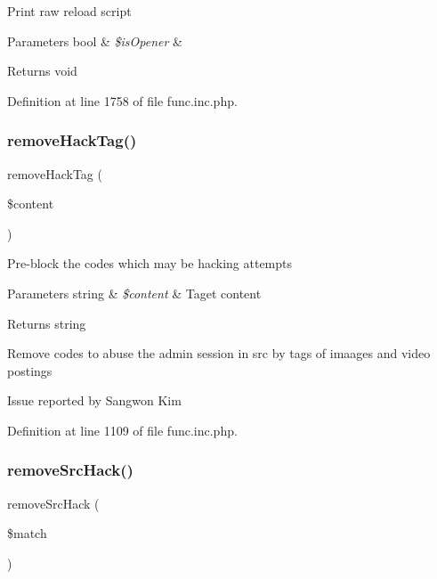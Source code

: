 Print raw reload script


\begin{DoxyParams}[1]{Parameters}
bool & {\em \$is\+Opener} & \\
\hline
\end{DoxyParams}
\begin{DoxyReturn}{Returns}
void 
\end{DoxyReturn}


Definition at line 1758 of file func.\+inc.\+php.

\hypertarget{func_8inc_8php_abde22c0ee89dfd569abd1e338b3b2cf5}{}\label{func_8inc_8php_abde22c0ee89dfd569abd1e338b3b2cf5} 
\subsubsection{\texorpdfstring{remove\+Hack\+Tag()}{removeHackTag()}}
{\footnotesize\ttfamily remove\+Hack\+Tag (\begin{DoxyParamCaption}\item[{}]{\$content }\end{DoxyParamCaption})}

Pre-\/block the codes which may be hacking attempts


\begin{DoxyParams}[1]{Parameters}
string & {\em \$content} & Taget content \\
\hline
\end{DoxyParams}
\begin{DoxyReturn}{Returns}
string 
\end{DoxyReturn}
Remove codes to abuse the admin session in src by tags of imaages and video postings
\begin{DoxyItemize}
\item Issue reported by Sangwon Kim
\end{DoxyItemize}

Definition at line 1109 of file func.\+inc.\+php.

\hypertarget{func_8inc_8php_aac01d80c0a850100a25ae023b78e6b7c}{}\label{func_8inc_8php_aac01d80c0a850100a25ae023b78e6b7c} 
\subsubsection{\texorpdfstring{remove\+Src\+Hack()}{removeSrcHack()}}
{\footnotesize\ttfamily remove\+Src\+Hack (\begin{DoxyParamCaption}\item[{}]{\$match }\end{DoxyParamCaption})}

